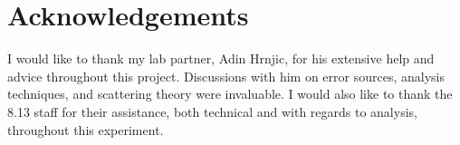 \section{Acknowledgements}
I would like to thank my lab partner, Adin Hrnjic, for his extensive help and advice throughout this project. Discussions with him on error sources, analysis techniques, and scattering theory were invaluable. I would also like to thank the 8.13 staff for their assistance, both technical and with regards to analysis, throughout this experiment.


